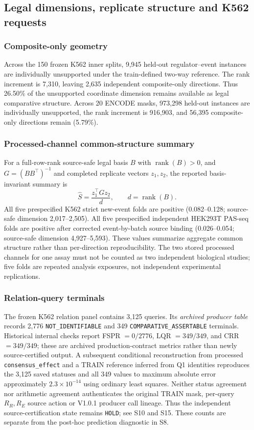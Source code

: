 \documentclass[11pt]{article}
\DeclareMathOperator{\rank}{rank}\DeclareMathOperator{\kerop}{ker}
\begin{document}
\subsection{Legal dimensions, replicate structure and K562 requests}
\subsubsection{Composite-only geometry}
Across the 150 frozen K562 inner splits, 9,945 held-out regulator--event instances are individually unsupported under the train-defined two-way reference. The rank increment is 7,310, leaving 2,635 independent composite-only directions. Thus 26.50\% of the unsupported coordinate dimension remains available as legal comparative structure. Across 20 ENCODE masks, 973,298 held-out instances are individually unsupported, the rank increment is 916,903, and 56,395 composite-only directions remain (5.79\%).

\subsubsection{Processed-channel common-structure summary}
For a full-row-rank source-safe legal basis $B$ with $\rank(B)>0$, and $G=(BB^\top)^{-1}$ and completed replicate vectors $z_1,z_2$, the reported basis-invariant summary is
\[
\widehat S=\frac{z_1^\top Gz_2}{d},\qquad d=\rank(B).
\]
All five prespecified K562 strict new-event folds are positive (0.082--0.128; source-safe dimension 2,017--2,505). All five prespecified independent HEK293T PAS-seq folds are positive after corrected event-by-batch source binding (0.026--0.054; source-safe dimension 4,927--5,593). These values summarize aggregate common structure rather than per-direction reproducibility. The two stored processed channels for one assay must not be counted as two independent biological studies; five folds are repeated analysis exposures, not independent experimental replications.

\subsubsection{Relation-query terminals}
The frozen K562 relation panel contains 3,125 queries. Its \emph{archived producer table} records 2,776 \texttt{NOT\_IDENTIFIABLE} and 349 \texttt{COMPARATIVE\_ASSERTABLE} terminals. Historical internal checks report FSPR $=0/2776$, LQR $=349/349$, and CRR $=349/349$; these are archived production-contract metrics rather than newly source-certified output. A subsequent conditional reconstruction from processed \texttt{consensus\_effect} and a TRAIN reference inferred from Q1 identities reproduces the 3,125 saved statuses and all 349 values to maximum absolute error approximately $2.3\times10^{-14}$ using ordinary least squares. Neither status agreement nor arithmetic agreement authenticates the original TRAIN mask, per-query $R_R,R_E$ source action or V1.0.1 producer call lineage. Thus the independent source-certification state remains \texttt{HOLD}; see S10 and S15. These counts are separate from the post-hoc prediction diagnostic in S8.
\end{document}
